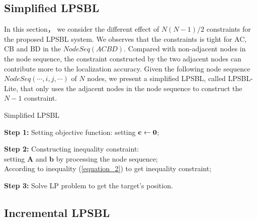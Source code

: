  \subsection{Simplified LPSBL}
 
  
  In this section， we consider the different effect of  $N(N - 1)/2$ constraints for the proposed LPSBL system.     
  We observes that the constraints is tight for AC, CB and BD in the $NodeSeq (A C B D)$.  
  Compared with non-adjacent nodes in the node sequence, the constraint constructed by the two adjacent nodes can contribute more to the localization accuracy. 
  Given the following node sequence $NodeSeq( \cdots ,i,j, \cdots )$ of $N$ nodes, 
  we present a simplified LPSBL, called LPSBL-Lite, that only uses the adjacent nodes in the node sequence to construct the $N-1$ constraint.

\begin{algorithm}
\caption{Simplified LPSBL}

\textbf{Step 1:} Setting objective function: setting $\bf{c} \leftarrow \bf{0}$;

\textbf{Step 2:} Constructing inequality constraint: \\ 
\hspace{0.41in} setting $\bm{A}$ and $\bm{b}$ by processing the node sequence;\\
{
{
According to inequality (\ref{equation_2}) to get inequality constraint;
}
}

\textbf{Step 3:} Solve LP problem to get the target's position.

\end{algorithm}


\subsection{Incremental LPSBL }


